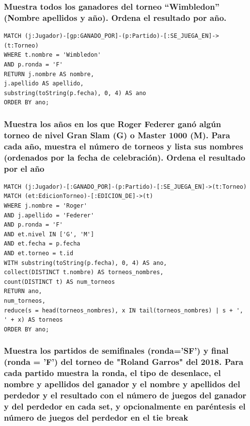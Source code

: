 \documentclass[11pt]{opticajnl}
\begin{document}
\subsubsection{Muestra todos los ganadores del torneo ``Wimbledon'' (Nombre apellidos y año). Ordena el resultado por año.}

\begin{lstlisting}[language=Cypher]
MATCH (j:Jugador)-[gp:GANADO_POR]-(p:Partido)-[:SE_JUEGA_EN]->(t:Torneo)
WHERE t.nombre = 'Wimbledon'
AND p.ronda = 'F'
RETURN j.nombre AS nombre,
j.apellido AS apellido,
substring(toString(p.fecha), 0, 4) AS ano
ORDER BY ano;
\end{lstlisting}





\subsubsection{Muestra los años en los que Roger Federer ganó algún torneo de nivel Gran Slam (G) o Master 1000 (M). Para cada año, muestra el número de torneos y lista sus nombres (ordenados por la fecha de celebración). Ordena el resultado por el año}

\begin{lstlisting}[language=Cypher]
MATCH (j:Jugador)-[:GANADO_POR]-(p:Partido)-[:SE_JUEGA_EN]->(t:Torneo)
MATCH (et:EdicionTorneo)-[:EDICION_DE]->(t)
WHERE j.nombre = 'Roger'
AND j.apellido = 'Federer'
AND p.ronda = 'F'
AND et.nivel IN ['G', 'M']
AND et.fecha = p.fecha
AND et.torneo = t.id
WITH substring(toString(p.fecha), 0, 4) AS ano,
collect(DISTINCT t.nombre) AS torneos_nombres,
count(DISTINCT t) AS num_torneos
RETURN ano,
num_torneos,
reduce(s = head(torneos_nombres), x IN tail(torneos_nombres) | s + ', ' + x) AS torneos
ORDER BY ano;
\end{lstlisting}





\subsubsection{Muestra los partidos de semiﬁnales (ronda='SF') y ﬁnal (ronda = 'F') del torneo de "Roland Garros" del 2018. Para cada partido muestra la ronda, el tipo de desenlace, el nombre y apellidos del ganador y el nombre y apellidos del perdedor y el resultado con el número de juegos del ganador y del perdedor en cada set, y opcionalmente en paréntesis el número de juegos del perdedor en el tie break}
\end{document}
